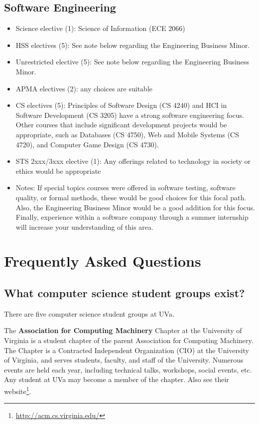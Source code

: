 \documentclass[10pt,letter]{book}
\newenvironment{itemlist}{
\begin{itemize}
\setlength{\itemsep}{0pt}
\setlength{\parskip}{0pt}}
{\end{itemize}}
\newcommand{\mysection}[1]{\section{#1}\renewcommand{\rightmark}{#1}}
\newcommand{\myurl}[1]{\footnote{\scriptsize\url{#1}}}
\begin{document}
\subsection{Software Engineering}
\begin{itemlist}
\item Science elective (1): Science of Information (ECE 2066)
\item HSS electives (5): See note below regarding the Engineering
  Business Minor.
\item Unrestricted elective (5): See note below regarding the
  Engineering Business Minor.
\item APMA electives (2): any choices are suitable
\item CS electives (5): Principles of Software Design (CS 4240) and
  HCI in Software Development (CS 3205) have a strong software
  engineering focus. Other courses that include significant development
  projects would be appropriate, such as Databases (CS 4750), Web and
  Mobile Systems (CS 4720), and Computer Game Design (CS 4730).
\item STS 2xxx/3xxx elective (1): Any offerings related to technology
  in society or ethics would be appropriate
\item Notes: If special topics courses were offered in software
  testing, software quality, or formal methods, these would be good
  choices for this focal path. Also, the Engineering Business Minor
  would be a good addition for this focus. Finally, experience within
  a software company through a summer internship will increase your
  understanding of this area.
\end{itemlist}

\mysection{Frequently Asked Questions}

\subsection{What computer science student groups exist?}

There are five computer science student groups at UVa.

The {\bf Association for Computing Machinery} Chapter at the
University of Virginia is a student chapter of the parent Association
for Computing Machinery. The Chapter is a Contracted Independent
Organization (CIO) at the University of Virginia, and serves students,
faculty, and staff of the University. Numerous events are held each
year, including technical talks, workshops, social events, etc.  Any
student at UVa may become a member of the chapter.  Also see their
website\myurl{http://acm.cs.virginia.edu/}.
\end{document}
